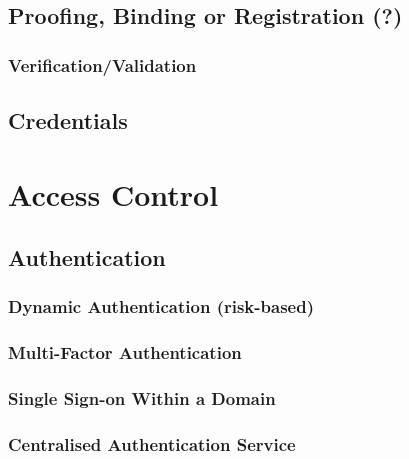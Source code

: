 \hypertarget{proofing-binding-or-registration}{%
\section{Proofing, Binding or Registration
(?)}\label{proofing-binding-or-registration}}

\hypertarget{verificationvalidation}{%
\subsection{Verification/Validation}\label{verificationvalidation}}

\hypertarget{credentials}{%
\section{Credentials}\label{credentials}}

\hypertarget{access-control}{%
\chapter{Access Control}\label{access-control}}

\hypertarget{authentication}{%
\section{Authentication}\label{authentication}}

\hypertarget{dynamic-authentication-risk-based}{%
\subsection{Dynamic Authentication
(risk-based)}\label{dynamic-authentication-risk-based}}

\hypertarget{multi-factor-authentication}{%
\subsection{Multi-Factor
Authentication}\label{multi-factor-authentication}}

\hypertarget{single-sign-on-within-a-domain}{%
\subsection{Single Sign-on Within a
Domain}\label{single-sign-on-within-a-domain}}

\hypertarget{centralised-authentication-service}{%
\subsection{Centralised Authentication
Service}\label{centralised-authentication-service}}

